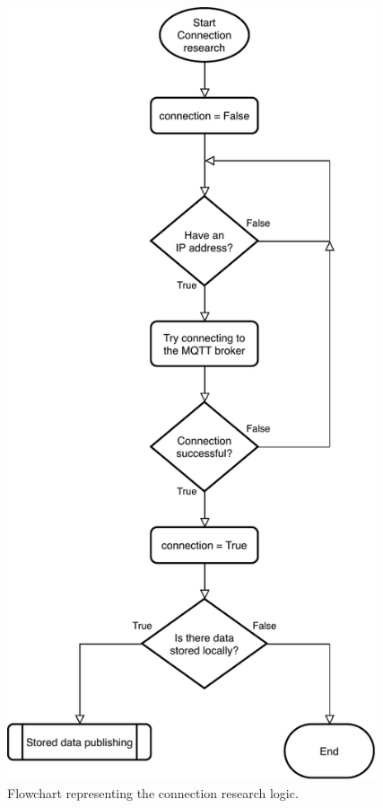 \begin{figure}[h]
\begin{minipage}[b]{8.5cm}
\centering
\includegraphics[width=0.97\textwidth]{images/flowconnection}
\caption{Flowchart representing the connection research logic.}

\end{minipage}
\end{figure}
